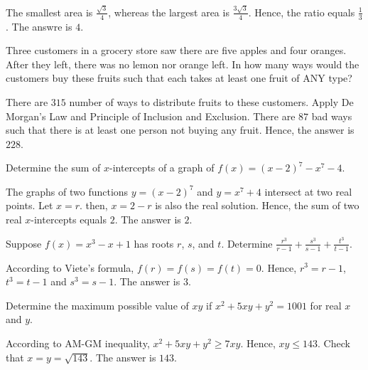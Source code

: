 \begin{solution}
The smallest area is $\frac{\sqrt{3}}{4}$, whereas the largest area is $\frac{3\sqrt{3}}{4}$. Hence, the ratio equals $\frac{1}{3}$. The answre is $4$.
\end{solution}

\begin{problem}
Three customers in a grocery store saw there are five apples and four oranges. After they left, there was no lemon nor orange left. In how many ways would the customers buy these fruits such that each takes at least one fruit of ANY type?
\end{problem}

\begin{solution}
There are $315$ number of ways to distribute fruits to these customers. Apply De Morgan's Law and Principle of Inclusion and Exclusion. There are $87$ bad ways such that there is at least one person not buying any fruit. Hence, the answer is $228$.
\end{solution}

\begin{problem}
Determine the sum of $x$-intercepts of a graph of $f(x)=(x-2)^7-x^7-4$.
\end{problem}

\begin{solution}
The graphs of two functions $y=(x-2)^7$ and $y=x^7+4$ intersect at two real points. Let $x=r$. then, $x=2-r$ is also the real solution. Hence, the sum of two real $x$-intercepts equals $2$. The answer is $2$.
\end{solution}

\begin{problem}
Suppose $f(x)=x^3-x+1$ has roots $r$, $s$, and $t$. Determine $\frac{r^3}{r-1}+\frac{s^3}{s-1}+\frac{t^3}{t-1}$.
\end{problem}

\begin{solution}
According to Viete's formula, $f(r)=f(s)=f(t)=0$. Hence, $r^3=r-1$, $t^3=t-1$ and $s^3=s-1$. The answer is $3$. 
\end{solution}

\begin{problem}
Determine the maximum possible value of $xy$ if $x^2+5xy+y^2=1001$ for real $x$ and $y$.
\end{problem}

\begin{solution}
According to AM-GM inequality, $x^2+5xy+y^2\geq 7xy$. Hence, $xy\leq 143$. Check that $x=y=\sqrt{143}$. The answer is $143$.
\end{solution}

